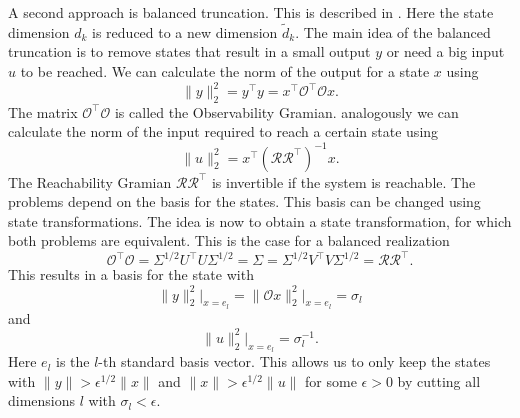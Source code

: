 \documentclass[doctype=mastersthesis,BCOR=15mm,biblatex]{ldvbook}%
\newcommand{\R}{\mathcal{R}} %
\newcommand{\Ob}{\mathcal{O}} %
\begin{document}
A second approach is balanced truncation. 
This is described in \cite{sandberg_balanced_2004,hinrichsen_improved_1990}. 
Here the state dimension $d_k$ is reduced to a new dimension $\tilde{d}_k$.
The main idea of the balanced truncation is to remove states that result in a small output $y$ or need a big input $u$ to be reached.
We can calculate the norm of the output for a state $x$ using
\begin{equation}
	\|y\|_2^2 = y^\top y = x^\top \Ob^\top \Ob x
	.
\end{equation}
The matrix $\Ob^\top \Ob$ is called the Observability Gramian.
analogously we can calculate the norm of the input required to reach a certain state using
\begin{equation}
	\|u\|_2^2 = x^\top (\R\R^\top)^{-1} x
	.
\end{equation}
The Reachability Gramian $\R\R^\top$ is invertible if the system is reachable.
The problems depend on the basis for the states. This basis can be changed using state transformations.
The idea is now to obtain a state transformation, for which both problems are equivalent. 
This is the case for a balanced realization
\begin{equation}
	\Ob^\top \Ob = \Sigma^{1/2}U^\top U\Sigma^{1/2} = \Sigma = \Sigma^{1/2} V^\top V \Sigma^{1/2} = \R \R^\top 
	.
\end{equation}
This results in a basis for the state with 
\begin{equation}
	\|y\|_2^2\big|_{x = e_l} = \|\Ob x\|_2^2\big|_{x = e_l} = \sigma_l
\end{equation}
and 
\begin{equation}
\|u\|_2^2\big|_{x = e_l} = \sigma_l^{-1}
.
\end{equation}
Here $e_l$ is the $l$-th standard basis vector.
This allows us to only keep the states with $\|y\| > \epsilon^{1/2} \|x\|$ and $\|x\| > \epsilon^{1/2} \|u\| $ for some $\epsilon>0$ by cutting all dimensions $l$ with $\sigma_l < \epsilon$.
\end{document}
